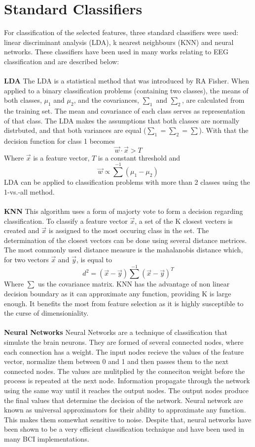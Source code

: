 \documentclass[12pt, a4paper, fleqn]{memoir}%
\begin{document}
\section{Standard Classifiers}
\label{sec:StandardClassifiers}
For classification of the selected features, three standard classifiers were used: linear discriminant analysis (LDA), k nearest neighbours (KNN) and neural networks. These classifiers have been used in many works relating to EEG classification and are described below:\\
\\
\textbf{LDA} The LDA is a statistical method that was introduced by RA Fisher\cite{fisher1936use}. When applied to a binary classification problems (containing two classes), the means of both classes, $\mu_1$ and $\mu_2$, and the covariances, $\sum_1$ and $\sum_2$, are calculated from the training set. The mean and covariance of each class serves as representation of that class. The LDA makes the assumptions that both classes are normally distrbuted, and that both variances are equal ($\sum_1 = \sum_2 = \sum$). With that the decision function for class 1 becomes 
$$\vec{w} \cdot \vec{x} > T $$
Where $\vec{x}$ is a feature vector, $T$ is a constant threshold and 
$$\vec{w} \propto \sum^{-1}(\mu_1 - \mu_2)$$
LDA can be applied to classification problems with more than 2 classes using the 1-vs.-all method\cite{hunterberger2003brain}.\\
\\
\textbf{KNN} This algorithm uses a form of majorty vote to form a decision regarding classification. To classify a feature vector $\vec{x}$, a set of the K closest vecters is created and $\vec{x}$ is assigned to the most occuring class in the set. The determination of the closest vectors can be done using several distance metrices. The most commonly used distance measure is the mahalanobis distance which, for two vectors $\vec{x}$ and $\vec{y}$, is equal to
$$d^2 = (\vec{x} - \vec{y})\sum^{-1}(\vec{x} - \vec{y})^{T}$$
Where $\sum$ us the covariance matrix. KNN has the advantage of non linear decision boundary as it can approximate any function, providing K is large enough. It benefits the most from feature selection as it is highly susceptible to the curse of dimensioniality\cite{lotte2007review}.\\
\\
\textbf{Neural Networks} Neural Networks are a technique of classification that simulate the brain neurons. They are formed of several connected nodes, where each connection has a weight. The input nodes recieve the values of the feature vector, normalize them between 0 and 1 and then passes them to the next connected nodes. The values are mulitplied by the conneciton weight before the process is repeated at the next node. Information propagate through the network using the same way until it reaches the output nodes. The output nodes produce the final values that determine the decision of the network. Neural network are known as universal approximators for their ability to approximate any function. This makes them somewhat sensitive to noise. Despite that, neural networks have been shown to be a very efficient classification technique and have been used in many BCI implementations.\\
\end{document}
